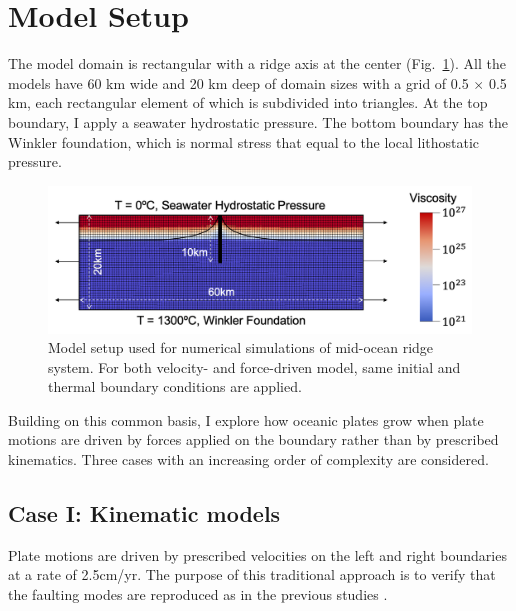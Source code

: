 \documentclass[letterpaper,12pt,notitle]{memphisthesis}                     %
\begin{document}
\section{Model Setup}
The model domain is rectangular with a ridge axis at the center  (Fig.~\ref{fig:modelsetup}). All the models have 60 km wide and 20 km deep of domain sizes with a grid of 0.5 $\times$ 0.5 km, each rectangular element of which is subdivided into triangles. At the top boundary, I apply a seawater hydrostatic pressure.
The bottom boundary has the Winkler foundation, which is normal stress that equal to the local lithostatic pressure.
%
\begin{figure}[!htb]
	\centering
	\includegraphics[width=0.8\linewidth,trim=8 8 8 8,clip]{./figs/modelsetup.png}
	\caption{Model setup used for numerical simulations of mid-ocean ridge system. For both velocity- and force-driven model, same initial and thermal boundary conditions are applied.}
	\label{fig:modelsetup}
\end{figure}
%

Building on this common basis, I explore how oceanic plates grow when plate motions are driven by forces applied on the boundary rather than by prescribed kinematics. Three cases with an increasing order of complexity are considered.

\subsection{Case I: Kinematic models}

Plate motions are driven by prescribed velocities on the left and right boundaries at a rate of 2.5cm/yr. The purpose of this traditional approach is to verify that the faulting modes are reproduced as in the previous studies \citep{Buck2005,Tucholke2008}.
\end{document}
